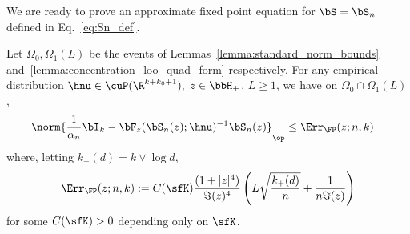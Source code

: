 We are ready to prove an approximate 
fixed point equation for $\bS = \bS_n$ defined in Eq.~\eqref{eq:Sn_def}.
\begin{lemma}
\label{lemma:fix_point_rate}
Let $\Omega_0,\Omega_1(L)$ be the events of Lemmas~\ref{lemma:standard_norm_bounds} and~\ref{lemma:concentration_loo_quad_form} respectively.
For any empirical distribution $\hnu\in\cuP(\R^{k+k_0+1}),$
$z \in\bbH_+$, $L\ge 1$, we have on $\Omega_0 \cap \Omega_1(L)$,
\begin{align}
    \norm{
\frac1{\alpha_n}\bI_k - \bF_z(\bS_n(z);\hnu)^{-1}
\bS_n(z)
    }_\op
&\le   
\Err_{\FP}(z; n,k)
\end{align}
where, letting $k_+(d) = k\vee \log d$,
\begin{align}
\Err_{\FP}(z;n,k) :=  C(\sfK) \frac{(1+|z|^4)}{\Im(z)^4} 
\left( L\sqrt{\frac{ k_+(d) }{n}}  
   +  \frac{1}{ n \Im(z)}\right)
\end{align}
for some $C(\sfK)>0$ depending only on $\sfK$.
\end{lemma}


